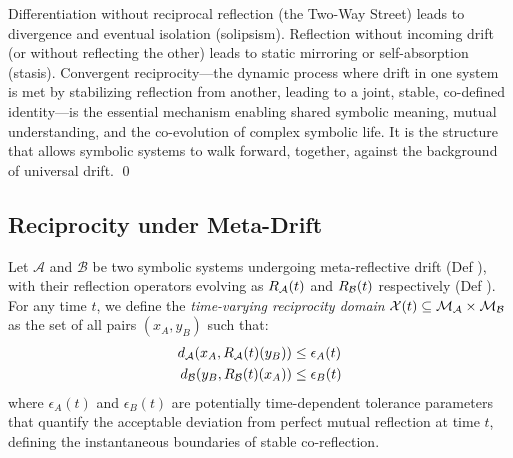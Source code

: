 \begin{scholium}
\label{scholium:bk7_on_symbolic_reciprocity}
Differentiation without reciprocal reflection (the Two-Way Street) leads to divergence and eventual isolation (solipsism). Reflection without incoming drift (or without reflecting the other) leads to static mirroring or self-absorption (stasis). Convergent reciprocity—the dynamic process where drift in one system is met by stabilizing reflection from another, leading to a joint, stable, co-defined identity—is the essential mechanism enabling shared symbolic meaning, mutual understanding, and the co-evolution of complex symbolic life. It is the structure that allows symbolic systems to walk forward, together, against the background of universal drift. \qed
\end{scholium}
\subsection{Reciprocity under Meta-Drift}
\label{subsec:bk7_reciprocity_under_meta_drift}
\begin{definition}
\label{definition:bk7_time_varying_reciprocity_domain}
Let \(\mathcal{A}\) and \(\mathcal{B}\) be two symbolic systems undergoing meta-reflective drift (Def ), with their reflection operators evolving as \(R_{\mathcal{A}}(t)\) and \(R_{\mathcal{B}}(t)\) respectively (Def ). For any time \(t\), we define the \textit{time-varying reciprocity domain} \(\mathcal{X}(t) \subseteq \mathcal{M}_{\mathcal{A}}\times\mathcal{M}_{\mathcal{B}}\) as the set of all pairs \((x_A, y_B)\) such that:
\begin{align}
d_{\mathcal{A}}(x_A, R_{\mathcal{A}}(t)(y_B)) &\leq \epsilon_A(t)  \\
d_{\mathcal{B}}(y_B, R_{\mathcal{B}}(t)(x_A)) &\leq \epsilon_B(t) 
\end{align}
where \(\epsilon_A(t)\) and \(\epsilon_B(t)\) are potentially time-dependent tolerance parameters that quantify the acceptable deviation from perfect mutual reflection at time \(t\), defining the instantaneous boundaries of stable co-reflection.
\end{definition}
